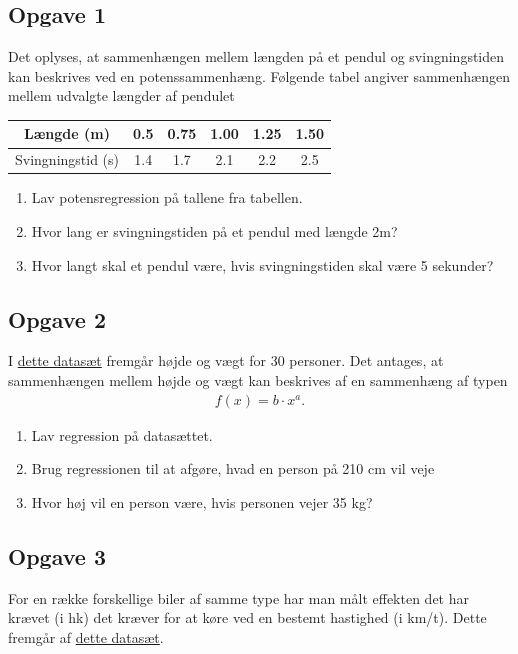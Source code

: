 \subsection*{Opgave 1}

Det oplyses, at sammenhængen mellem længden på et pendul og svingningstiden kan beskrives ved en potenssammenhæng. Følgende tabel angiver sammenhængen mellem udvalgte længder af pendulet

\begin{center}\begin{tabular}{c|c|c|c|c|c}
Længde (m)& 0.5 & 0.75 & 1.00 & 1.25 & 1.50\\ \hline
Svingningstid (s) & 1.4 & 1.7 & 2.1 & 2.2 & 2.5 
\end{tabular}
\end{center}

\begin{enumerate}[label=\roman*)]
	\item Lav potensregression på tallene fra tabellen. 
	\item Hvor lang er svingningstiden på et pendul med længde 2m?
	\item Hvor langt skal et pendul være, hvis svingningstiden skal være 5 sekunder?
\end{enumerate}


\subsection*{Opgave 2}
I \href{https://github.com/ChristianJLex/TeachingNotes/raw/master/2023-2024/Data%20og%20lign/H%C3%B8jdeV%C3%A6gt.xlsx}{\color{blue!60} dette datasæt} fremgår højde og vægt for 30 personer. Det antages, at sammenhængen mellem højde og vægt kan beskrives af en sammenhæng af typen
\begin{align*}
	f(x) = b \cdot x^a.
\end{align*}

\begin{enumerate}[label=\roman*)]
	\item Lav regression på datasættet.
	\item Brug regressionen til at afgøre, hvad en person på 210 cm vil veje
	\item Hvor høj vil en person være, hvis personen vejer 35 kg?
\end{enumerate}

\subsection*{Opgave 3}
For en række forskellige biler af samme type har man målt effekten det har krævet (i hk) det kræver for at køre ved en bestemt hastighed (i km/t). Dette fremgår af \href{https://github.com/ChristianJLex/TeachingNotes/raw/master/2023-2024/Data og lign/hk.xlsx}{\color{blue!60} dette datasæt}.

